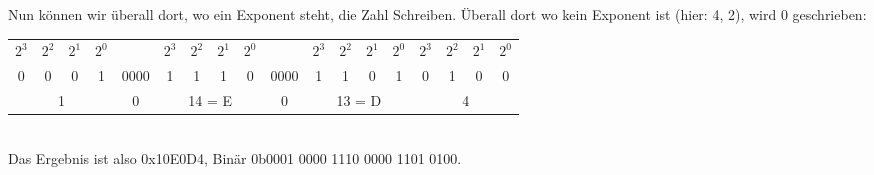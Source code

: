 Nun können wir überall dort, wo ein Exponent steht, die Zahl Schreiben. Überall dort wo kein Exponent ist (hier: 4, 2), wird 0 geschrieben:\\
\begin{tabular}{cccc|c|cccc|c|cccc|cccc}
    $2^3$&$2^2$&$2^1$&$2^0$&&$2^3$&$2^2$&$2^1$&$2^0$&&$2^3$&$2^2$&$2^1$&$2^0$&$2^3$&$2^2$&$2^1$&$2^0$\\
    0&0&0&1&0000&1&1&1&0&0000&1&1&0&1&0&1&0&0\\
    \hline
    \multicolumn{4}{c|}{1}&\multicolumn{1}{c|}{0}&\multicolumn{4}{c|}{14 = E}&\multicolumn{1}{c|}{0}&\multicolumn{4}{c|}{13 = D}&\multicolumn{4}{c}{4}\\
\end{tabular}\\[1em]
Das Ergebnis ist also 0x10E0D4, Binär 0b0001 0000 1110 0000 1101 0100.